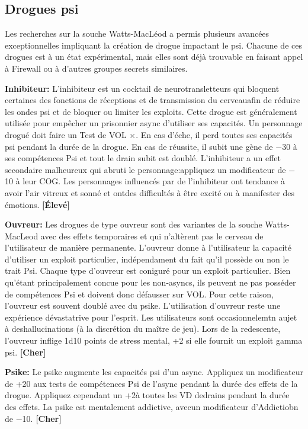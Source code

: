 \subsection{Drogues psi} \label{sec:psi-drugs} 

Les recherches sur la souche Watts-MacLéod a permis plusieurs avancées exceptionnelles impliquant la création de drogue impactant le psi. Chacune de ces drogues est à un état expérimental, mais elles sont déjà trouvable en faisant appel à Firewall ou à d'autres groupes secrets similaires. 

\textbf{Inhibiteur:} L'inhibiteur est un cocktail de neurotransletteurs qui bloquent certaines des fonctions de réceptions et de transmission du cerveauafin de réduire les ondes psi et de bloquer ou limiter les exploits. Cette drogue est généralement utilisée pour empêcher un prisonnier async d'utiliser ses capacités. Un personnage drogué doit faire un Test de VOL $\times$. En cas d'éche, il perd toutes ses capacités psi pendant la durée de la drogue. En cas de réussite, il subit une gène de $-$30 à ses compétences Psi et tout le drain subit est doublé. L'inhibiteur a un effet secondaire malheureux qui abruti le personnage:appliquez un modificateur de $-$10 à leur COG. Les personnages influencés par de l'inhibiteur ont tendance à avoir l'air vitreux et sonné et ontdes difficultés à être excité ou à manifester des émotions. \textbf{[Élevé]} 

\textbf{Ouvreur:} Les drogues de type ouvreur sont des variantes de la souche Watts-MacLeod avec des effets temporaires et qui n'altèrent pas le cerveau de l'utilisateur de manière permanente. L'ouvreur donne à l'utilisateur la capacité d'utiliser un exploit particulier, indépendament du fait qu'il possède ou non le trait Psi. Chaque type d'ouvreur est coniguré pour un exploit particulier. Bien qu'étant principalement concue pour les non-asyncs, ils peuvent ne pas posséder de compétences Psi et doivent donc défausser sur VOL. Pour cette raison, l'ouvreur est souvent doublé avec du psike. L'utilisation d'ouvreur reste une expérience dévastatrive pour l'esprit. Les utilisateurs sont occasionnelemtn aujet à deshallucinations (à la discrétion du maître de jeu). Lors de la redescente, l'ouvreur inflige 1d10 points de stress mental, +2 si elle fournit un exploit gamma psi. \textbf{[Cher]} 

\textbf{Psike:} Le psike augmente les capacités psi d'un async. Appliquez un modificateur de +20 aux tests de compétences Psi de l'async pendant la durée des effets de la drogue. Appliquez cependant un +2à toutes les VD dedrains pendant la durée des effets. La psike est mentalement addictive, avecun modificateur d'Addictiobn de $-$10. \textbf{[Cher]} 


